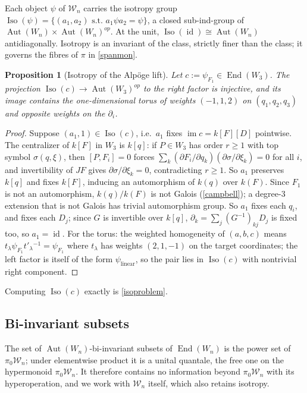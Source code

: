 \documentclass[11pt]{article}
\theoremstyle{change}
\newtheorem{prop}[equation]{Proposition}
\theoremstyle{nonumberplain}
\newtheorem{proof}{Proof}
\newcommand\cW{{\mathcal W}}
\newcommand\st{{\textrm{ s.t.\ }}}
\newcommand\setof[1]{\{ #1 \}}
\DeclareMathOperator{\End}{End}
\DeclareMathOperator{\Aut}{Aut}
\DeclareMathOperator{\Iso}{Iso}
\DeclareMathOperator{\id}{id}
\DeclareMathOperator{\im}{im}
\begin{document}
Each object $\psi$ of $\cW_n$ carries the isotropy group $\Iso(\psi) = \setof{(a_1, a_2) \st a_1 \psi a_2 = \psi}$, a closed sub-ind-group of $\Aut(W_n) \times \Aut(W_n)^{op}$. At the unit, $\Iso(\id) \cong \Aut(W_n)$ antidiagonally. Isotropy is an invariant of the class, strictly finer than the class; it governs the fibres of $\pi$ in \cref{spanmon}.

\begin{prop}[Isotropy of the Alp\"oge lift\label{isoprop}]
Let $c := \psi_{F_1} \in \End(W_3)$. The projection $\Iso(c) \to \Aut(W_3)^{op}$ to the right factor is injective, and its image contains the one-dimensional torus of weights $(-1,1,2)$ on $(q_1,q_2,q_3)$ and opposite weights on the $\partial_i$.
\end{prop}

\begin{proof}
Suppose $(a_1, 1) \in \Iso(c)$, i.e.\ $a_1$ fixes $\im c = k[F][D]$ pointwise. The centralizer of $k[F]$ in $W_3$ is $k[q]$: if $P \in W_3$ has order $r \geq 1$ with top symbol $\sigma(q,\xi)$, then $[P, F_i] = 0$ forces $\sum_k (\partial F_i/\partial q_k)(\partial \sigma/\partial \xi_k) = 0$ for all $i$, and invertibility of $JF$ gives $\partial\sigma/\partial\xi_k = 0$, contradicting $r \geq 1$. So $a_1$ preserves $k[q]$ and fixes $k[F]$, inducing an automorphism of $k(q)$ over $k(F)$. Since $F_1$ is not an automorphism, $k(q)/k(F)$ is not Galois (\cref{campbell}); a degree-$3$ extension that is not Galois has trivial automorphism group. So $a_1$ fixes each $q_i$, and fixes each $D_j$; since $G$ is invertible over $k[q]$, $\partial_k = \sum_j (G^{-1})_{kj} D_j$ is fixed too, so $a_1 = \id$. For the torus: the weighted homogeneity of $(a,b,c)$ means $t_\lambda \psi_{F_1} t'_\lambda{}^{-1} = \psi_{F_1}$ where $t_\lambda$ has weights $(2,1,-1)$ on the target coordinates; the left factor is itself of the form $\psi_{\text{linear}}$, so the pair lies in $\Iso(c)$ with nontrivial right component.
\end{proof}

Computing $\Iso(c)$ exactly is \cref{isoproblem}.

\subsection{Bi-invariant subsets}

The set of $\Aut(W_n)$-bi-invariant subsets of $\End(W_n)$ is the power set of $\pi_0 \cW_n$; under elementwise product it is a unital quantale, the free one on the hypermonoid $\pi_0 \cW_n$. It therefore contains no information beyond $\pi_0 \cW_n$ with its hyperoperation, and we work with $\cW_n$ itself, which also retains isotropy.
\end{document}
